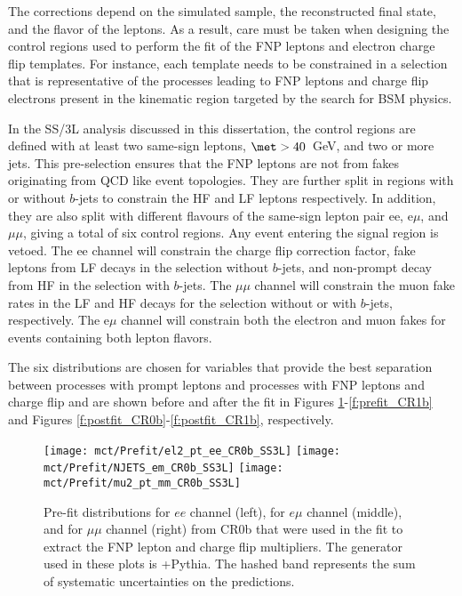 The corrections depend on the simulated sample,
the reconstructed final state, and the flavor of the leptons. As a result, care must be taken when designing the control regions 
used to perform the fit of the FNP leptons and electron charge flip templates. 
For instance, each template needs to be constrained in a selection that is representative of the processes leading to 
FNP leptons and charge flip electrons present in the kinematic region targeted by the search for BSM physics. 

In the SS/3L analysis discussed in this dissertation, the control regions are defined with at least two same-sign 
leptons, $\met>40$~GeV, and two or more jets. This pre-selection ensures that the FNP leptons are not from fakes originating from 
QCD like event topologies. 
They are further split in regions 
with or without $b$-jets to constrain the HF and LF leptons respectively. In addition, they are also split with different 
flavours of the same-sign lepton pair ee, e$\mu$, and $\mu\mu$, giving a total of six control regions. 
Any event entering the signal region is vetoed. The ee channel will constrain the charge flip correction factor, fake leptons 
 from LF decays in the selection without $b$-jets, and non-prompt decay from HF in the selection with $b$-jets. 
The $\mu\mu$ channel will constrain the muon fake rates in the LF and HF decays for the selection without or with $b$-jets, 
respectively. The e$\mu$ channel will constrain both the electron and muon fakes for events containing both lepton flavors. 

The six distributions are chosen for variables that provide the best separation between processes with prompt leptons and processes with FNP leptons and charge flip and are shown 
before and after the fit in Figures \ref{f:prefit_CR0b}-\ref{f:prefit_CR1b} and Figures \ref{f:postfit_CR0b}-\ref{f:postfit_CR1b}, respectively. 

 \begin{figure}[!htb]
   \texttt{[image: mct/Prefit/el2\_pt\_ee\_CR0b\_SS3L]}
   \texttt{[image: mct/Prefit/NJETS\_em\_CR0b\_SS3L]}
   \texttt{[image: mct/Prefit/mu2\_pt\_mm\_CR0b\_SS3L]}
 \caption{
 Pre-fit distributions for  $ee$ channel (left),  for  $e\mu$ channel (middle), and  for  $\mu\mu$ channel (right) from CR0b that were used in the fit to extract the FNP lepton and charge flip multipliers.
The generator used in these plots is  \POWHEGBOX+Pythia. The hashed band represents the sum of systematic uncertainties on the predictions.
 \label{f:prefit_CR0b}
 }
 \end{figure}

